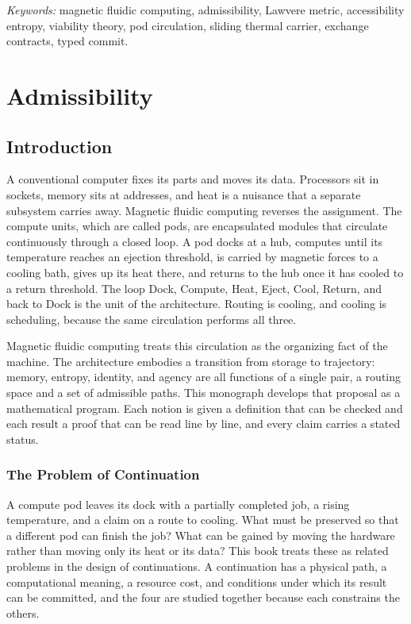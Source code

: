 \documentclass[11pt,openany]{book}
\theoremstyle{plain}
\theoremstyle{definition}
\theoremstyle{remark}
\begin{document}
\vspace{1em}
\noindent\textit{Keywords:} magnetic fluidic computing, admissibility, Lawvere metric, accessibility entropy, viability theory, pod circulation, sliding thermal carrier, exchange contracts, typed commit.

\tableofcontents
\mainmatter
\part{Admissibility}

\chapter{Introduction}
\label{ch:intro}

A conventional computer fixes its parts and moves its data. Processors sit in sockets, memory sits at addresses, and heat is a nuisance that a separate subsystem carries away. Magnetic fluidic computing reverses the assignment. The compute units, which are called pods, are encapsulated modules that circulate continuously through a closed loop. A pod docks at a hub, computes until its temperature reaches an ejection threshold, is carried by magnetic forces to a cooling bath, gives up its heat there, and returns to the hub once it has cooled to a return threshold. The loop Dock, Compute, Heat, Eject, Cool, Return, and back to Dock is the unit of the architecture. Routing is cooling, and cooling is scheduling, because the same circulation performs all three.

Magnetic fluidic computing treats this circulation as the organizing fact of the machine. The architecture embodies a transition from storage to trajectory: memory, entropy, identity, and agency are all functions of a single pair, a routing space and a set of admissible paths. This monograph develops that proposal as a mathematical program. Each notion is given a definition that can be checked and each result a proof that can be read line by line, and every claim carries a stated status.

\section{The Problem of Continuation}

A compute pod leaves its dock with a partially completed job, a rising temperature, and a claim on a route to cooling. What must be preserved so that a different pod can finish the job? What can be gained by moving the hardware rather than moving only its heat or its data? This book treats these as related problems in the design of continuations. A continuation has a physical path, a computational meaning, a resource cost, and conditions under which its result can be committed, and the four are studied together because each constrains the others.
\end{document}
